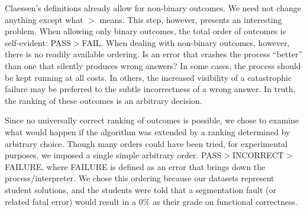 \documentclass[11pt,twoside]{article}
\theoremstyle{definition}
\begin{document}
Claessen's definitions already allow for non-binary outcomes. We need not change anything except what $>$ means. This step, however, presents an interesting problem. When allowing only binary outcomes, the total order of outcomes is self-evident: PASS$>$FAIL. When dealing with non-binary outcomes, however, there is no readily available ordering. Is an error that crashes the process ``better'' than one that silently produces wrong answers? In some cases, the process should be kept running at all costs. In others, the increased visibility of a catastrophic failure may be preferred to the subtle incorrectness of a wrong answer. In truth, the ranking of these outcomes is an arbitrary decision.

Since no universally correct ranking of outcomes is possible, we chose to examine what would happen if the algorithm was extended by a ranking determined by arbitrary choice. Though many orders could have been tried, for experimental purposes, we imposed a single simple arbitrary order. PASS$>$INCORRECT$>$FAILURE, where FAILURE is defined as an error that brings down the process/interpreter. We chose this ordering because our datasets represent student solutions, and the students were told that a segmentation fault (or related fatal error) would result in a 0\% as their grade on functional correctness.
\end{document}
